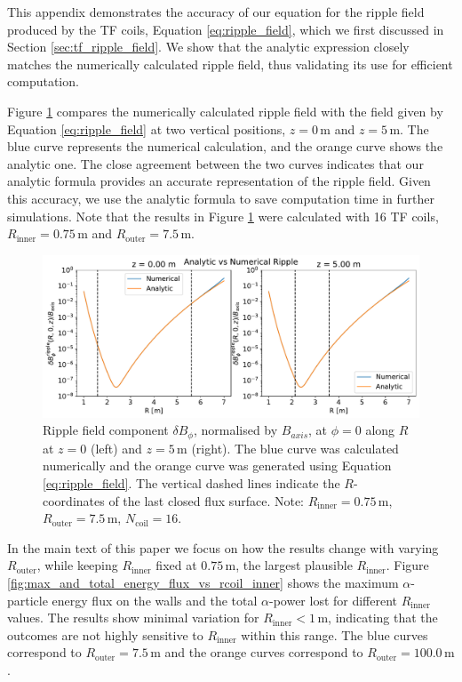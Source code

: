 \documentclass[10pt, a4paper, twoside]{article}
\begin{document}
This appendix demonstrates the accuracy of our equation for the ripple field produced by the TF coils, Equation \eqref{eq:ripple_field}, which we first discussed in Section \ref{sec:tf_ripple_field}. We show that the analytic expression closely matches the numerically calculated ripple field, thus validating its use for efficient computation.

Figure \ref{fig:ripple_check} compares the numerically calculated ripple field with the field given by Equation \eqref{eq:ripple_field} at two vertical positions, \( z = 0 \, \text{m} \) and \( z = 5 \, \text{m} \). The blue curve represents the numerical calculation, and the orange curve shows the analytic one. The close agreement between the two curves indicates that our analytic formula provides an accurate representation of the ripple field. Given this accuracy, we use the analytic formula to save computation time in further simulations. Note that the results in Figure \ref{fig:ripple_check} were calculated with 16 TF coils, \( R_{\text{inner}} = 0.75\, \text{m} \) and \( R_{\text{outer}} = 7.5\, \text{m} \).

\begin{figure}[h!]
    \centering
    \includegraphics[width=0.99\linewidth]{Figures/ripple_check.pdf}
    \caption{Ripple field component \( \delta B_\phi \), normalised by \( B_{axis} \), at \( \phi = 0 \) along \( R \) at \( z = 0 \) (left) and \( z = 5\, \text{m} \) (right). The blue curve was calculated numerically and the orange curve was generated using Equation \eqref{eq:ripple_field}. The vertical dashed lines indicate the \( R \)-coordinates of the last closed flux surface. Note: \(R_\text{inner} = 0.75\, \text{m}\), \( R_{\text{outer}} = 7.5\, \text{m} \), \( N_{\text{coil}} = 16 \).}
    \label{fig:ripple_check}
\end{figure}

In the main text of this paper we focus on how the results change with varying \( R_\text{outer} \), while keeping \( R_\text{inner} \) fixed at \( 0.75\,\text{m} \), the largest plausible \( R_\text{inner} \). Figure \ref{fig:max_and_total_energy_flux_vs_rcoil_inner} shows the maximum $\alpha$-particle energy flux on the walls and the total $\alpha$-power lost for different \( R_\text{inner} \) values. The results show minimal variation for \( R_\text{inner} < 1\,\text{m} \), indicating that the outcomes are not highly sensitive to \( R_\text{inner} \) within this range. The blue curves correspond to \( R_\text{outer} = 7.5\,\text{m} \) and the orange curves correspond to \( R_\text{outer} = 100.0\,\text{m} \).
\end{document}
